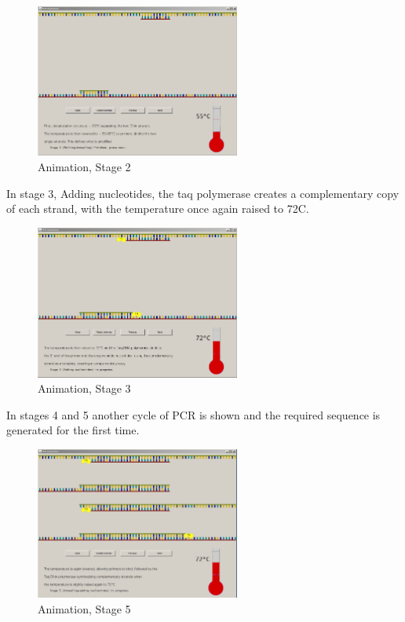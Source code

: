 \begin{figure}[!t]
  \begin{center}
	\includegraphics[width=0.6\textwidth]{./images/AnimImpl/Stage2.png}
    \caption{
      \label{fig:AnimImpl:stage2}
      Animation, Stage 2
    }
  \end{center}
\end{figure}

In stage 3, Adding nucleotides, the taq polymerase creates a complementary copy of each strand, with the temperature once again raised to 72\degree C.

\begin{figure}[!t]
  \begin{center}
	\includegraphics[width=0.6\textwidth]{./images/AnimImpl/Stage3.png}
    \caption{
      \label{fig:AnimImpl:stage3}
      Animation, Stage 3
    }
  \end{center}
\end{figure}

In stages 4 and 5 another cycle of PCR is shown and the required sequence is generated for the first time.

\begin{figure}[!t]
  \begin{center}
	\includegraphics[width=0.6\textwidth]{./images/AnimImpl/Stage5.png}
    \caption{
      \label{fig:AnimImpl:stage5}
      Animation, Stage 5
    }
  \end{center}
\end{figure}

